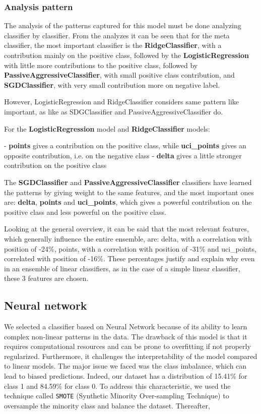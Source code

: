 \documentclass[a4paper, twoside]{article}
\begin{document}
\subsubsection{Analysis pattern}

The analysis of the patterns captured for this model must be done analyzing classifier by classifier. From the analyzes it can be seen that for the meta classifier, the most important classifier is the \textbf{RidgeClassifier}, with a contribution mainly on the positive class, followed by the \textbf{LogisticRegression} with little more contributions to the positive class, followed by \textbf{PassiveAggressiveClassifier}, with small positive class contribution, and \textbf{SGDClassifier}, with very small contribution more on negative label.

However, LogisticRegression and RidgeClassifier considers same pattern like important, as like as SDGClassifier and PassiveAggressiveClassifier do.

For the \textbf{LogisticRegression} model and \textbf{RidgeClassifier} models:

- \textbf{points} gives a contribution on the positive class, while \textbf{uci\_points} gives an opposite contribution, i.e. on the negative class
- \textbf{delta} gives a little stronger contribution on the positive class

The \textbf{SGDClassifier} and \textbf{PassiveAggressiveClassifier} classifiers have learned the patterns by giving weight to the same features, and the most important ones are:  \textbf{delta}, \textbf{points} and \textbf{uci\_points}, which gives a powerful contribution on the positive class and less powerful on the positive class.

Looking at the general overview, it can be said that the most relevant features, which generally influence the entire ensemble, are: delta, with a correlation with position of -24\%, points, with a correlation with position of -31\% and uci\_points, correlated with position of -16\%. These percentages justify and explain why even in an ensemble of linear classifiers, as in the case of a simple linear classifier, these 3 features are chosen.




\subsection{Neural network}
We selected a classifier based on Neural Network because of its ability to learn complex non-linear patterns in the data. 
The drawback of this model is that it requires computational resources and can be prone to overfitting if not properly regularized. Furthermore, it challenges the interpretability of the model compared to linear models.
The major issue we faced was the class imbalance, which can lead to biased predictions. Indeed, our dataset has a distribution of 15.41\% for class 1 and 84.59\% for class 0.
To address this characteristic, we used the technique called \texttt{SMOTE} (Synthetic Minority Over-sampling Technique) to oversample the minority class and balance the dataset.
Thereafter, 
\end{document}
